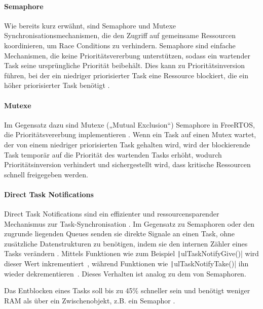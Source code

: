 \paragraph{Semaphore}

Wie bereits kurz erwähnt, sind Semaphore und Mutexe Synchronisationsmechanismen,
die den Zugriff auf gemeinsame Ressourcen koordinieren, um Race Conditions zu
verhindern. Semaphore sind einfache Mechanismen, die keine Prioritätsvererbung
unterstützen, sodass ein wartender Task seine ursprüngliche Priorität beibehält.
Dies kann zu Prioritätsinversion führen, bei der ein niedriger priorisierter
Task eine Ressource blockiert, die ein höher priorisierter Task benötigt
\cite{wikipedia_priority_inversion}.

\paragraph{Mutexe}

Im Gegensatz dazu sind Mutexe („Mutual Exclusion“) Semaphore in FreeRTOS, die
Prioritätsvererbung implementieren \cite{freertos_mutexes}. Wenn ein Task auf
einen Mutex wartet, der von einem niedriger priorisierten Task gehalten wird,
wird der blockierende Task temporär auf die Priorität des wartenden Tasks
erhöht, wodurch Prioritätsinversion verhindert und sichergestellt wird, dass
kritische Ressourcen schnell freigegeben werden.

\paragraph{Direct Task Notifications}

Direct Task Notifications sind ein effizienter und ressourcensparender
Mechanismus zur Task-Synchronisation \cite{freertos_task_notifications_desc}. Im
Gegensatz zu Semaphoren oder den zugrunde liegenden Queues senden sie direkte
Signale an einen Task, ohne zusätzliche Datenstrukturen zu benötigen, indem sie
den internen Zähler eines Tasks verändern \cite{freertos_tasks_c_213}. Mittels
Funktionen wie zum Beispiel \texttt|ulTaskNotifyGive()| wird dieser Wert
inkrementiert~\cite{freertos_tasks_c_4296}, während Funktionen wie
\texttt|ulTaskNotifyTake()| ihn wieder
dekrementieren~\cite{freertos_tasks_c_3926}. Dieses Verhalten ist analog zu dem
von Semaphoren.

Das Entblocken eines Tasks soll bis zu 45\% schneller sein und benötigt weniger
RAM als über ein Zwischenobjekt, z.B. ein Semaphor
\cite{freertos_task_notifications_usage}.

